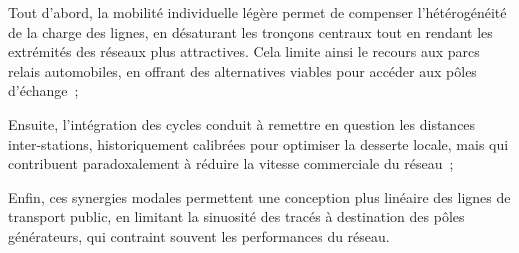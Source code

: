 \begin{refsegment}
\begin{customitemize}
    \item Tout d’abord, la mobilité individuelle légère permet de compenser l’hétérogénéité de la charge des lignes, en désaturant les tronçons centraux tout en rendant les extrémités des réseaux plus attractives. Cela limite ainsi le recours aux parcs relais automobiles, en offrant des alternatives viables pour accéder aux pôles d’échange~;
    \item Ensuite, l’intégration des cycles conduit à remettre en question les distances inter-stations, historiquement calibrées pour optimiser la desserte locale, mais qui contribuent paradoxalement à réduire la vitesse commerciale du réseau~;
    \item Enfin, ces synergies modales permettent une conception plus linéaire des lignes de transport public, en limitant la sinuosité des tracés à destination des pôles générateurs, qui contraint souvent les performances du réseau.
\end{customitemize}%


\end{refsegment}
